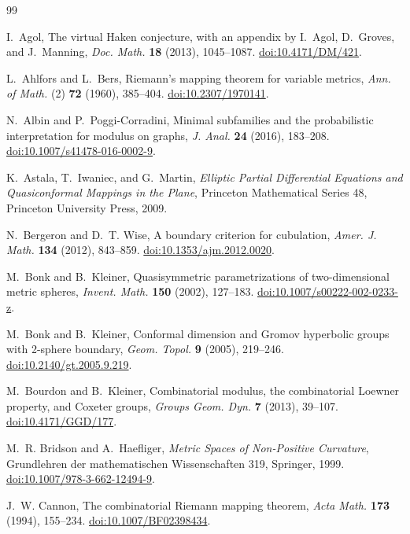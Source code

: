 \begin{thebibliography}{99}

I.~Agol, The virtual Haken conjecture, with an appendix by
I.~Agol, D.~Groves, and J.~Manning,
\emph{Doc. Math.} \textbf{18} (2013), 1045--1087.
\href{https://doi.org/10.4171/DM/421}{doi:10.4171/DM/421}.

L.~Ahlfors and L.~Bers, Riemann's mapping theorem for variable metrics,
\emph{Ann. of Math.} (2) \textbf{72} (1960), 385--404.
\href{https://doi.org/10.2307/1970141}{doi:10.2307/1970141}.

N.~Albin and P.~Poggi-Corradini,
Minimal subfamilies and the probabilistic interpretation for modulus on graphs,
\emph{J. Anal.} \textbf{24} (2016), 183--208.
\href{https://doi.org/10.1007/s41478-016-0002-9}{doi:10.1007/s41478-016-0002-9}.

K.~Astala, T.~Iwaniec, and G.~Martin,
\emph{Elliptic Partial Differential Equations and Quasiconformal
Mappings in the Plane}, Princeton Mathematical Series 48,
Princeton University Press, 2009.

N.~Bergeron and D.~T. Wise, A boundary criterion for cubulation,
\emph{Amer. J. Math.} \textbf{134} (2012), 843--859.
\href{https://doi.org/10.1353/ajm.2012.0020}{doi:10.1353/ajm.2012.0020}.

M.~Bonk and B.~Kleiner,
Quasisymmetric parametrizations of two-dimensional metric spheres,
\emph{Invent. Math.} \textbf{150} (2002), 127--183.
\href{https://doi.org/10.1007/s00222-002-0233-z}{doi:10.1007/s00222-002-0233-z}.

M.~Bonk and B.~Kleiner,
Conformal dimension and Gromov hyperbolic groups with 2-sphere boundary,
\emph{Geom. Topol.} \textbf{9} (2005), 219--246.
\href{https://doi.org/10.2140/gt.2005.9.219}{doi:10.2140/gt.2005.9.219}.

M.~Bourdon and B.~Kleiner,
Combinatorial modulus, the combinatorial Loewner property, and Coxeter groups,
\emph{Groups Geom. Dyn.} \textbf{7} (2013), 39--107.
\href{https://doi.org/10.4171/GGD/177}{doi:10.4171/GGD/177}.

M.~R. Bridson and A.~Haefliger,
\emph{Metric Spaces of Non-Positive Curvature},
Grundlehren der mathematischen Wissenschaften 319, Springer, 1999.
\href{https://doi.org/10.1007/978-3-662-12494-9}{doi:10.1007/978-3-662-12494-9}.

J.~W. Cannon, The combinatorial Riemann mapping theorem,
\emph{Acta Math.} \textbf{173} (1994), 155--234.
\href{https://doi.org/10.1007/BF02398434}{doi:10.1007/BF02398434}.


\end{thebibliography}
